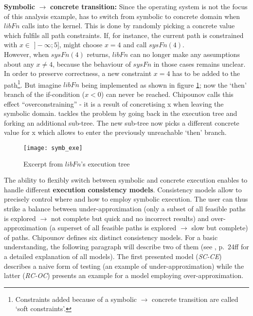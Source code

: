 \medskip
\textbf{Symbolic} $\rightarrow$ \textbf{concrete transition:}
Since the operating system is not the focus of this analysis example, \sse has to switch from symbolic to concrete domain when $libFn$ calls into the kernel.
This is done by randomly picking a concrete value which fulfils all path constraints.
If, for instance, the current path is constrained with $x \in$ $]-\infty;5]$, \sse might choose $x=4$ and call $sysFn(4)$.\\
However, when $sysFn(4)$ returns, $libFn$ can no longer make any assumptions about any $x \neq 4$, because the behaviour of $sysFn$ in those cases remains unclear.
In order to preserve correctness, a new constraint $x = 4$ has to be added to the path\footnote{Constraints added because of a symbolic $\rightarrow$ concrete transition are called `soft constraints'.}.
But imagine $libFn$ being implemented as shown in figure \ref{fig:ssetree2}; now the `then' branch of the if-condition ($x < 0$) can never be reached.
Chipounov calls this effect ``overconstraining'' \cite{chip14s2e} - it is a result of concretising x when leaving the symbolic domain.
\sse tackles the problem by going back in the execution tree and forking an additional sub-tree.
The new sub-tree now picks a different concrete value for x which allows to enter the previously unreachable `then' branch.

\begin{figure}
\texttt{[image: symb\_exe]}
\caption{Excerpt from $libFn$'s execution tree \cite{chip12s2e}}
\label{fig:ssetree2}
\end{figure}


\medskip
The ability to flexibly switch between symbolic and concrete execution enables \sse to handle different \textbf{execution consistency models}.
Consistency models allow to precisely control where and how to employ symbolic execution.
The user can thus strike a balance between under-approximation (only a subset of all feasible paths is explored $\rightarrow$ not complete but quick and no incorrect results) and over-approximation (a superset of all feasible paths is explored $\rightarrow$ slow but complete) of paths.
Chipounov defines six distinct consistency models.
For a basic understanding, the following paragraph will describe two of them (see \cite{chip14s2e}, p.~24ff for a detailed explanation of all models).
The first presented model (\textit{SC-CE}) describes a naive form of testing (an example of under-approximation) while the latter (\textit{RC-OC}) presents an example for a model employing over-approximation.

